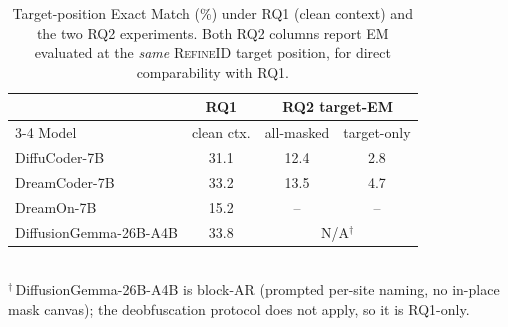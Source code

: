 \begin{table}[t]
  \centering
  \caption{Target-position Exact Match (\%) under RQ1 (clean context) and the
           two RQ2 experiments. Both RQ2 columns report EM evaluated at the
           \emph{same} \textsc{RefineID} target position, for direct
           comparability with RQ1.}
  \label{tab:rq2_em}
  \small
  \setlength{\tabcolsep}{6pt}
  \renewcommand{\arraystretch}{1.05}
  \begin{tabular}{@{}lccc@{}}
    \toprule
                  & RQ1            & \multicolumn{2}{c}{RQ2 target-EM} \\
    \cmidrule(l){3-4}
    Model         & clean ctx.     & all-masked & target-only \\
    \midrule
    DiffuCoder-7B          & 31.1 & 12.4 & 2.8 \\
    DreamCoder-7B          & 33.2 & 13.5 & 4.7 \\
    DreamOn-7B             & 15.2 & --   & --  \\
    DiffusionGemma-26B-A4B & 33.8 & \multicolumn{2}{c}{N/A$^{\dagger}$} \\
    \bottomrule
  \end{tabular}
  \\[2pt]
  {\footnotesize $^{\dagger}$\,DiffusionGemma-26B-A4B is block-AR (prompted
  per-site naming, no in-place mask canvas); the deobfuscation protocol does not
  apply, so it is RQ1-only.}
\end{table}


